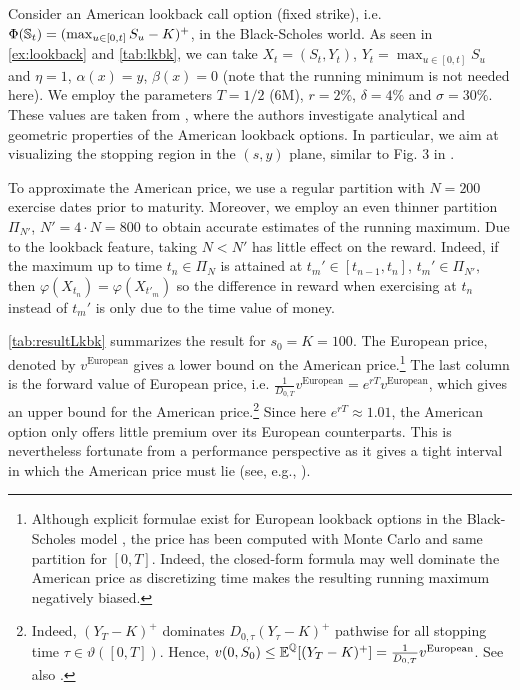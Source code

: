 Consider an  American lookback call option (fixed strike), i.e.  $\Phi(\operatorname{\mathbb{S}}_t) = (\max_{u\in[0,t]} S_u - K)^+$,  in the Black-Scholes world.  %
As seen in \cref{ex:lookback} and \cref{tab:lkbk}, we can take $X_t = (S_t,Y_t)$, $Y_t = \max_{u\in[0,t]} S_u$  and $\eta=1$, $\alpha(x) = y$, $\beta(x) = 0$ (note that the running minimum is not needed here). 
We employ the parameters $T=1/2$ ($6$M),   $r=2\%$, $\delta =4\%$ and $\sigma = 30 \%$. 
These values are taken from  \citet{DaiKwok}, where the authors investigate analytical and geometric properties of the American lookback options. In particular, we aim at visualizing the stopping region in the $(s,y)$ plane, similar to Fig. $3$ in \cite{DaiKwok}.   %

To approximate the American price, we use a regular partition  with $N=200$ exercise dates prior to maturity. %
Moreover, we employ an even thinner  partition $\Pi_{N'}$, $N'=4\cdot N = 800$ to obtain accurate estimates of  the running maximum. Due to the lookback feature,  taking $N < N'$ has little effect on the reward. Indeed, if the maximum up to time $t_n\in \Pi_{N}$  is attained at $t_m' \in [t_{n-1},t_{n}]$,  $t_m'\in \Pi_{N'},$ then $\varphi(X_{t_n})=\varphi(X_{t'_m})$ so the difference in reward  when exercising at $t_n$ instead of $t_m'$ is only due to the time value of money. 

\cref{tab:resultLkbk} summarizes the result for $s_0=K=100$. The European price, denoted by $v^{\text{European}}$ gives a lower bound on the American price.\footnote{Although explicit formulae exist for European lookback options in the Black-Scholes model \cite{Conze}, the price has been computed with Monte Carlo and same  partition for $[0,T]$. Indeed, the closed-form formula may well dominate the American price as discretizing time makes the resulting running maximum  negatively biased. }   
The  last  column is the  forward value of European price, i.e.  $\frac{1}{D_{0,T}}v^{\text{European}} = e^{rT}v^{\text{European}}$, which  gives an upper bound for the American price.\footnote{Indeed, $(Y_{T}-K)^{+}$ dominates  $D_{0,\tau}(Y_{\tau}-K)^{+}$ pathwise for all stopping time $\tau \in \vartheta([0,T])$. Hence, $ v(0,S_0) \le \operatorname{\mathbb{E}}^{\operatorname{\mathbb{Q}}}[(Y_{T}-K)^{+}] = \frac{1}{D_{0,T}}v^{\text{European}}$. See also \citet{Conze}. } Since here $e^{rT} \approx 1.01$, the American option only offers little premium over its European counterparts. This is nevertheless  fortunate from a performance perspective as it gives a tight interval in which the American price must lie (see, e.g., \cite{Conze}).  

